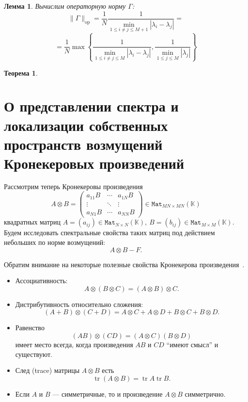 \documentclass[14pt,a4paper]{extarticle}
\newtheorem{thm}{Теорема}
\newtheorem{lem}{Лемма}
\theoremstyle{definition}
\begin{document}
\begin{lem}
    Вычислим операторную норму \( \Gamma \):
    \[
        \|\Gamma\|_{\mathrm{op}} =
        \frac1N
        \frac{1}{\min\limits_{1\leq i{\neq}j \leq M{+}1}|\lambda_i - \lambda_j|} =
        \]
    \[
        = \frac1N
         \max\left\{
         \frac{1}{
             \min\limits_{1\leq i{\neq}j \leq M }{|\lambda_i - \lambda_j|}},
         \frac{1}{
             \min\limits_{1\leq j \leq M}{|\lambda_j|}}
         \right\}
        \]
\end{lem}

\begin{thm}\label{nk:thm:tiled}
  
\end{thm}

\newpage
\section{О представлении спектра и локализации собственных пространств
  возмущений Кронекеровых произведений}

Рассмотрим теперь Кронекеровы произведения
\[
    A\otimes B =
    \begin{pmatrix}
        a_{11} B & \cdots & a_{1N} B \\
        \vdots   & \ddots & \vdots \\
        a_{N1} B & \cdots & a_{NN} B
    \end{pmatrix}
    \in \mathtt{Mat}_{{MN}{\times}{MN}}(\mathbb{K})
\]
квадратных матриц
\( A={(a_{ij})}\in\mathtt{Mat}_{N{\times}N}(\mathbb{K}),
 \ B={(b_{ij})}\in\mathtt{Mat}_{M{\times}M}(\mathbb{K}). \)
Будем исследовать спектральные свойства таких матриц под действием небольших по
норме возмущений:
\begin{equation}\label{-kronperturb}
    A\otimes B - F.
\end{equation}


Обратим внимание на некоторые полезные свойства Кронекерова произведения~\cite{bellman-matrices-kron}.
\begin{itemize}
\item Ассоциативность:
    \[ A\otimes (B\otimes C) = (A\otimes B)\otimes C. \]
\item Дистрибутивность относительно сложения:
    \[ (A+B)\otimes(C+D) = A\otimes C + A\otimes D + B\otimes C + B\otimes D. \]
\item Равенство
    \[ (AB)\otimes(CD) = (A\otimes C)(B\otimes D) \]
    имеет место
    всегда, когда произведения \( AB \) и \( CD \) ``имеют смысл'' и существуют.
  \item След (trace) матрицы \( A\otimes B \) есть
    \[ \operatorname{tr}(A\otimes B) = \operatorname{tr}A\operatorname{tr}B. \]
\item Если \( A \) и \( B \) --- симметричные,
      то и произведение \( A\otimes B \) симметрично.
\end{itemize}
\end{document}
